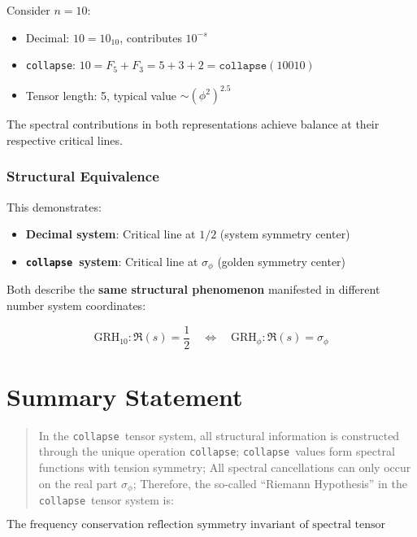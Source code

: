 \documentclass[12pt,a4paper]{article}
\theoremstyle{plain}
\theoremstyle{definition}
\theoremstyle{remark}
\newcommand{\collapse}{\texttt{collapse}}
\begin{document}
Consider $n = 10$:
\begin{itemize}
\item Decimal: $10 = 10_{10}$, contributes $10^{-s}$
\item \collapse: $10 = F_5 + F_3 = 5 + 3 + 2 = \collapse(10010)$
\item Tensor length: 5, typical value $\sim (\phi^2)^{2.5}$
\end{itemize}

The spectral contributions in both representations achieve balance at their respective critical lines.

\subsubsection{Structural Equivalence}

This demonstrates:
\begin{itemize}
\item \textbf{Decimal system}: Critical line at $1/2$ (system symmetry center)
\item \textbf{\collapse\ system}: Critical line at $\sigma_\phi$ (golden symmetry center)
\end{itemize}

Both describe the \textbf{same structural phenomenon} manifested in different number system coordinates:

\begin{equation}
\boxed{
\text{GRH}_{10}: \Re(s) = \frac{1}{2} \quad \Leftrightarrow \quad \text{GRH}_\phi: \Re(s) = \sigma_\phi
}
\end{equation}

\section{Summary Statement}

\begin{quote}
In the \collapse\ tensor system, all structural information is constructed through the unique operation \collapse;
\collapse\ values form spectral functions with tension symmetry;
All spectral cancellations can only occur on the real part $\sigma_\phi$;
Therefore, the so-called ``Riemann Hypothesis'' in the \collapse\ tensor system is:
\end{quote}

\begin{equation}
\boxed{
\text{The frequency conservation reflection symmetry invariant of spectral tensor structure}
}
\end{equation}
\end{document}
